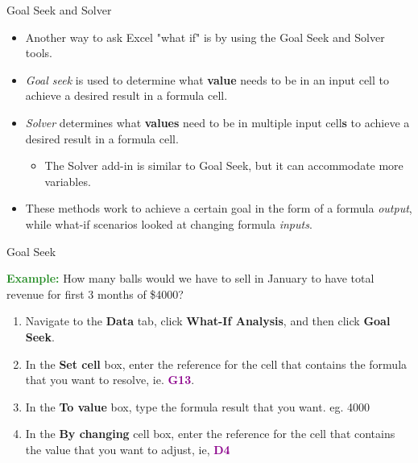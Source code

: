 \documentclass[xcolor=svgnames, handout]{beamer}
\newcommand{\cell}[1]{{\sf \textbf{\textcolor{DarkMagenta}{#1}}}}
\begin{document}
\begin{frame}{Goal Seek and Solver}
\begin{itemize}

\item Another way to ask Excel "what if" is by using the Goal Seek and Solver tools. \\
\medskip
\item \emph{Goal seek} %
 is used to determine what {\bf value} needs to be in an input cell to achieve a desired result in a formula cell.  \\
 \medskip
\item  \emph{Solver} determines what {\bf values} need to be in multiple input cell{\bf s} to achieve a desired result in a formula cell.  
\begin{itemize}
\item The Solver add-in is similar to Goal Seek, but it can accommodate more variables.
\end{itemize}

\medskip
\item These methods work to achieve a certain goal in the form of a formula \textit{output}, while what-if scenarios looked at changing formula \textit{inputs}.
\end{itemize}
\end{frame}


\begin{frame}{Goal Seek}
\begin{exampleblock}
{}\textcolor{ForestGreen}{\bf Example:} How many balls would we have to sell in January to have total revenue for first 3 months of \$4000?  
\end{exampleblock}
 \begin{enumerate}
 \item Navigate to the {\bf Data} tab, click {\bf What-If Analysis}, and then click {\bf Goal Seek}.
 \item In the {\bf Set cell} box, enter the reference for the cell that contains the formula that you want to resolve, ie. \cell{G13}.

\item In the {\bf To value} box, type the formula result that you want. eg. 4000

\item In the {\bf By changing} cell box, enter the reference for the cell that contains the value that you want to adjust, ie, \cell{D4}
 \end{enumerate}

 \end{frame}
\end{document}

